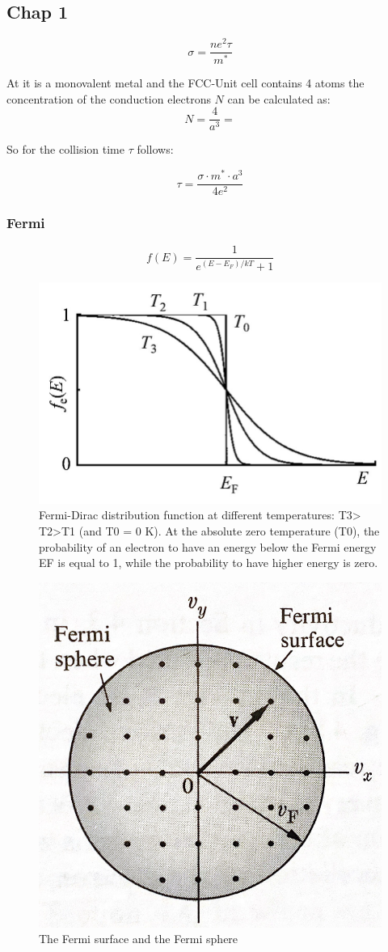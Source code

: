 \subsection{Chap 1 } \label{chap1}

\begin{equation}
    \sigma = \frac{n e^2 \tau}{m^*}
\end{equation}


At it is a monovalent metal and the FCC-Unit cell contains 
4 atoms the concentration of the conduction electrons $N$ can be
calculated as:
$$N =\frac{4}{a^3} = $$

So for the collision time $\tau$ follows:

$$\tau = \frac{\sigma \cdot m^* \cdot a^3}{4e^2}$$

\subsubsection*{Fermi}

\begin{equation}
    f(E) = \frac{1}{e^{(E-E_F)/kT}+1}
\end{equation}

\begin{figure}[H]
    \centering
    \includegraphics[width=0.5\linewidth]{Graphics/Chapter1/Fermi-Dirac-distribution.png}
    \caption{Fermi-Dirac distribution function at different temperatures: T3> T2>T1
     (and T0 = 0 K). At the absolute zero temperature (T0), the probability of an 
     electron to have an energy below the Fermi energy EF is equal to 1, while the 
     probability to have higher energy is zero.}
    \label{}
\end{figure}


\begin{figure}[H]
    \centering
    \includegraphics[width=0.4\linewidth]{Graphics/Chapter1/Fermi_Sphere.png}
    \caption{The Fermi surface and the Fermi sphere \cite[asdfadf]{elementary_SSP} }
    \label{}
\end{figure}

